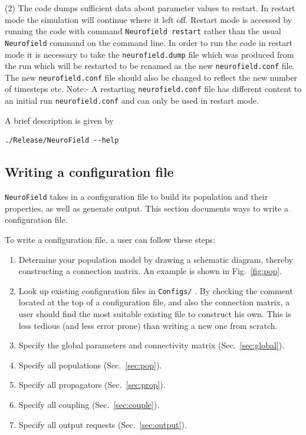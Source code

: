 \documentclass[12pt,a4paper]{article}
\newcommand{\type}[1]{ {\small\small\tt #1} }
\begin{document}
(2) The code dumps sufficient data about parameter values to restart. In restart mode the simulation will continue where it left off. Restart mode is accessed by running the code with command \type{Neurofield restart} rather than the usual \type{Neurofield} command on the command line. In order to run the code in restart mode it is necessary to take the \type{neurofield.dump} file which was produced from the run which will be restarted to be renamed as the new \type{neurofield.conf} file. The new \type{neurofield.conf} file should also be changed to reflect the new number of timesteps etc.  Note:- A restarting \type{neurofield.conf} file has different content to an initial run \type{neurofield.conf} and can only be used in restart mode.

A brief description is given by
\begin{lstlisting}
./Release/NeuroField --help
\end{lstlisting}

\subsection{Writing a configuration file}

\type{NeuroField} takes in a configuration file to build its population and their properties, as well as generate output. This section documents ways to write a configuration file.

To write a configuration file, a user can follow these steps:
\begin{enumerate}
\item Determine your population model by drawing a schematic diagram, thereby constructing a connection matrix. An example is shown in Fig.~\ref{fig:pop}.
\item Look up existing configuration files in \type{Configs/}. By checking the comment located at the top of a configuration file, and also the connection matrix, a user should find the most suitable existing file to construct his own. This is less tedious (and less error prone) than writing a new one from scratch.
\item Specify the global parameters and connectivity matrix (Sec.~\ref{sec:global}).
\item Specify all populations (Sec.~\ref{sec:pop}).
\item Specify all propagators (Sec.~\ref{sec:prop}).
\item Specify all coupling (Sec.~\ref{sec:couple}).
\item Specify all output requests (Sec.~\ref{sec:output}).
\end{enumerate}
\end{document}
